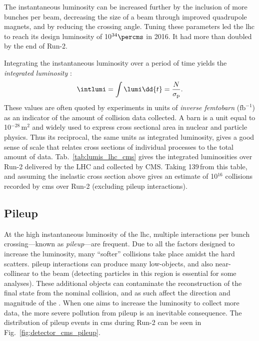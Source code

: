 
The instantaneous luminosity can be increased further by the inclusion of more bunches per beam, decreasing the size of a beam through improved quadrupole magnets, and by reducing the crossing angle. Tuning these parameters led the \acrshort{lhc} to reach its design luminosity of 10$^{34}\percms$ in 2016. It had more than doubled by the end of Run-2.

Integrating the instantaneous luminosity over a period of time yields the \emph{integrated luminosity} \intlumi:
\begin{equation}
    \intlumi = \int \lumi \dd{t} = \frac{N}{\sigma_{\mathrm{p}}}.
    \label{eq:lumi_integrated}
\end{equation}
These values are often quoted by experiments in units of \emph{inverse femtobarn} ($\text{fb}^{-1}$) as an indicator of the amount of collision data collected. A barn is a unit equal to 10$^{-28}$\,m$^2$ and widely used to express cross sectional area in nuclear and particle physics. Thus its reciprocal, the same units as integrated luminosity, gives a good sense of scale that relates cross sections of individual processes to the total amount of data. Tab.~\ref{tab:lumis_lhc_cms} gives the integrated luminosities over Run-2 delivered by the LHC and collected by CMS. Taking 139\,\fbinv from this table, and assuming the inelastic \pp cross section above gives an estimate of 10$^{16}$ collisions recorded by \acrshort{cms} over Run-2 (excluding \gls{pileup} interactions).




\subsection{Pileup}
\label{subsec:pileup}

At the high instantaneous luminosity of the \acrshort{lhc}, multiple interactions per bunch crossing---known as \emph{\gls{pileup}}---are frequent. Due to all the factors designed to increase the luminosity, many ``softer'' collisions take place amidst the hard scatters. \Gls{pileup} interactions can produce many low-\pt objects, and also near-collinear to the beam (detecting particles in this region is essential for some analyses). These additional objects can contaminate the reconstruction of the final state from the nominal collision, and as such affect the direction and magnitude of the \ptvecmiss. When one aims to increase the luminosity to collect more data, the more severe pollution from \gls{pileup} is an inevitable consequence. The distribution of \gls{pileup} events in \acrshort{cms} during Run-2 can be seen in Fig.~\ref{fig:detector_cms_pileup}.

